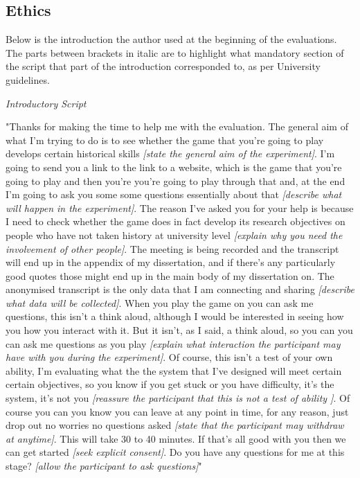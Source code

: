 \documentclass{l4proj}
\begin{document}
%
% 

\begin{appendices}

\chapter{Ethics}

Below is the introduction the author used at the beginning of the evaluations. The parts between brackets in italic are to highlight what mandatory section of the script that part of the introduction corresponded to, as per University guidelines.

\emph{Introductory Script}

"Thanks for making the time to help me with the evaluation. The general aim of what I'm trying to do is to see whether the game that you're going to play develops certain historical skills \emph{[state the general aim of the experiment]}. I'm going to send you a link to the link to a website, which is the game that you're going to play and then you're you're going to play through that and, at the end I'm going to ask you some some questions essentially about that \emph{[describe what will happen in the experiment]}. The reason I've asked you for your help is because I need to check whether the game does in fact develop its research objectives on people who have not taken history at university level \emph{[explain why you need the involvement of other people]}. The meeting is being recorded and the transcript will end up in the appendix of my dissertation, and if there's any particularly good quotes those might end up in the main body of my dissertation on. The anonymised transcript is the only data that I am connecting and sharing \emph{[describe what data will be collected]}. When you play the game on you can ask me questions, this isn't a think aloud, although I would be interested in seeing how you how you interact with it. But it isn't, as I said, a think aloud, so you can you can ask me questions as you play \emph{[explain what interaction the participant may have with you during the experiment]}. Of course, this isn't a test of your own ability, I'm evaluating what the the system that I've designed will meet certain certain objectives, so you know if you get stuck or you have difficulty, it's the system, it's not you \emph{[reassure the participant that this is not a test of ability ]}. Of course you can you know you can leave at any point in time, for any reason, just drop out no worries no questions asked \emph{[state that the participant may withdraw at anytime]}. This will take 30 to 40 minutes. If that's all good with you then we can get started \emph{[seek explicit consent]}. Do you have any questions for me at this stage? \emph{[allow the participant to ask questions]}"


\end{appendices}
\end{document}
